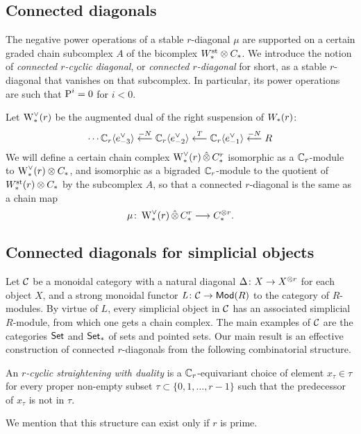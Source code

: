 \subsection{Connected diagonals}

The negative power operations of a stable $r$-diagonal $\mu$ are supported on a certain graded chain subcomplex $A$ of the bicomplex $W^{\mathrm{st}}_{*} \otimes C_{*}$. We introduce the notion of \emph{connected $r$-cyclic diagonal}, or \textit{connected $r$-diagonal} for short, as a stable $r$-diagonal that vanishes on that subcomplex. In particular, its power operations are such that $\operatorname{P}^i = 0$ for $i<0$.

Let $\operatorname{W}^\vee_{*}(r)$ be the augmented dual of the right suspension of $W_{*}(r)$:
\[
\dotsb
\mathbb{C}_r\langle e_{-3}^\vee\rangle
\overset{-N}{\longleftarrow}
\mathbb{C}_r\langle e_{-2}^\vee\rangle
\overset{T}{\longleftarrow}
\mathbb{C}_r\langle e_{-1}^{\vee}\rangle
\overset{-N}{\longleftarrow}
R
\]
We will define a certain chain complex $\operatorname{W}^\vee_{*}(r)\operatorname{\hat{\otimes}} C^{r}_{*}$ isomorphic as a $\mathbb{C}_r$-module to $\operatorname{W}^\vee_{*}(r)\otimes C_{*}$, and isomorphic as a bigraded $\mathbb{C}_r$-module to the quotient of $W^{\mathrm{st}}_{*}(r)\otimes C_{*}$ by the subcomplex $A$, so that a connected $r$-diagonal is the same as a chain map
\[
\mu\colon \operatorname{W}^\vee_{*}(r)\operatorname{\hat{\otimes}} C^{r}_{*}\longrightarrow C_{*}^{\otimes r}.
\]

\subsection{Connected diagonals for simplicial objects}

Let $\mathcal{C}$ be a monoidal category with a natural diagonal $\Delta \colon X \to X^{\otimes r}$ for each object $X$, and a strong monoidal functor $\operatorname{{\it L}} \colon \mathcal{C} \to \mathsf{Mod}(R)$ to the category of $R$-modules.
By virtue of $L$, every simplicial object in $\mathcal{C}$ has an associated simplicial $R$-module, from which one gets a chain complex.
The main examples of $\mathcal{C}$ are the categories $\mathsf{Set}$ and $\mathsf{Set}_*$ of sets and pointed sets.
Our main result is an effective construction of connected $r$-diagonals from the following combinatorial structure.

\begin{definition}
	An \emph{$r$-cyclic straightening with duality} is a $\mathbb{C}_r$-equivariant choice of element $x_\tau\in \tau$ for every proper non-empty subset $\tau \subset \{0,1,\dots,r-1\}$ such that the predecessor of $x_\tau$ is not in $\tau$.
\end{definition}

We mention that this structure can exist only if $r$ is prime.

